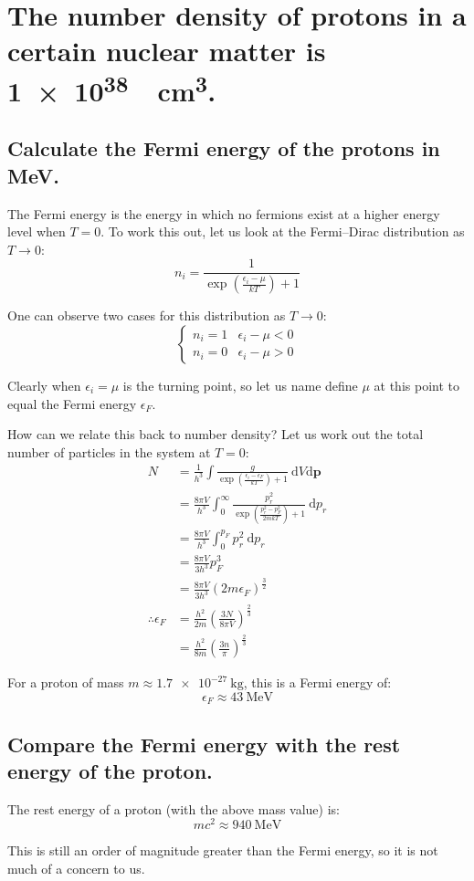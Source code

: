 \documentclass[a4paper]{scrartcl}
\begin{document}
\section{The number density of protons in a certain nuclear matter is \SI{1e38}{\per\centi\metre\cubed}.}
\subsection{Calculate the Fermi energy of the protons in \si{\mega\electronvolt}.}
The Fermi energy is the energy in which no fermions exist at a higher energy level when \(T = 0\). To work this out, let us look at the Fermi--Dirac distribution as \(T \to 0\):
\[n_i = \frac{1}{\exp\left(\frac{\epsilon_i - \mu}{k T}\right) + 1}\]

One can observe two cases for this distribution as \(T \to 0\):
\[\begin{cases}
    n_i = 1 & \epsilon_i - \mu < 0 \\
    n_i = 0 & \epsilon_i - \mu > 0
\end{cases}\]

Clearly when \(\epsilon_i = \mu\) is the turning point, so let us name define \(\mu\) at this point to equal the Fermi energy \(\epsilon_F\).

How can we relate this back to number density? Let us work out the total number of particles in the system at \(T = 0\):
\begin{align*}
    N &= \frac{1}{h^3} \int \frac{g}{\exp\left(\frac{\epsilon_i - \epsilon_F}{k T}\right) + 1} \:\mathrm{d} V \mathrm{d} \mathbf{p} \\
    &= \frac{8 \pi V}{h^3} \int_0^\infty \frac{p_r^2}{\exp\left(\frac{p_r^2 - p_F^2}{2 m k T}\right) + 1} \:\mathrm{d} p_r \\
    &= \frac{8 \pi V}{h^3} \int_0^{p_F} p_r^2 \:\mathrm{d} p_r \\
    &= \frac{8 \pi V}{3 h^3} p_F^3 \\
    &= \frac{8 \pi V}{3 h^3} (2 m \epsilon_F)^\frac{3}{2} \\
    \therefore \epsilon_F &= \frac{h^2}{2 m} \left(\frac{3 N}{8 \pi V}\right)^\frac{2}{3} \\
    &= \frac{h^2}{8 m} \left(\frac{3 n}{\pi}\right)^\frac{2}{3}
\end{align*}

For a proton of mass \(m \approx \SI{1.7e-27}{\kilo\gram}\), this is a Fermi energy of:
\[\epsilon_F \approx \SI{43}{\mega\electronvolt}\]

\subsection{Compare the Fermi energy with the rest energy of the proton.}
The rest energy of a proton (with the above mass value) is:
\[m c^2 \approx \SI{940}{\mega\electronvolt}\]

This is still an order of magnitude greater than the Fermi energy, so it is not much of a concern to us.
\end{document}

